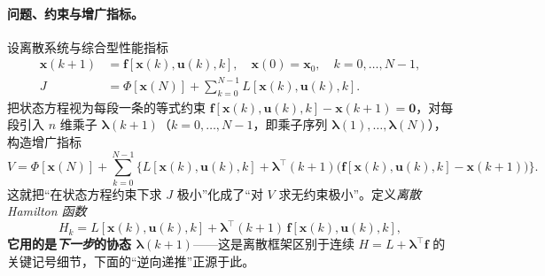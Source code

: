 \paragraph{问题、约束与增广指标。}
设离散系统与综合型性能指标
\begin{align}
  \mathbf x(k+1)&=\mathbf f[\mathbf x(k),\mathbf u(k),k],\quad \mathbf x(0)=\mathbf x_0,\quad k=0,\dots,N-1,\label{eq:oc-disc-sys}\\
  J&=\Phi[\mathbf x(N)]+\sum_{k=0}^{N-1}L[\mathbf x(k),\mathbf u(k),k].\label{eq:oc-disc-cost}
\end{align}
把状态方程视为每段一条的等式约束 $\mathbf f[\mathbf x(k),\mathbf u(k),k]-\mathbf x(k+1)=\mathbf0$，对每段引入 $n$ 维乘子 $\boldsymbol\lambda(k+1)$（$k=0,\dots,N-1$，即乘子序列 $\boldsymbol\lambda(1),\dots,\boldsymbol\lambda(N)$），构造增广指标
\begin{equation}
  V=\Phi[\mathbf x(N)]+\sum_{k=0}^{N-1}\Big\{L[\mathbf x(k),\mathbf u(k),k]+\boldsymbol\lambda^\top(k+1)\big(\mathbf f[\mathbf x(k),\mathbf u(k),k]-\mathbf x(k+1)\big)\Big\}.
  \label{eq:oc-disc-augmented}
\end{equation}
这就把“在状态方程约束下求 $J$ 极小”化成了“对 $V$ 求无约束极小”。定义\emph{离散 Hamilton 函数}
\begin{equation}
  \boxed{H_k=L[\mathbf x(k),\mathbf u(k),k]+\boldsymbol\lambda^\top(k+1)\,\mathbf f[\mathbf x(k),\mathbf u(k),k],}
  \label{eq:oc-disc-hamiltonian}
\end{equation}
\textbf{它用的是\emph{下一步}的协态 $\boldsymbol\lambda(k+1)$}——这是离散框架区别于连续 $H=L+\boldsymbol\lambda^\top\mathbf f$ 的关键记号细节，下面的“逆向递推”正源于此。

